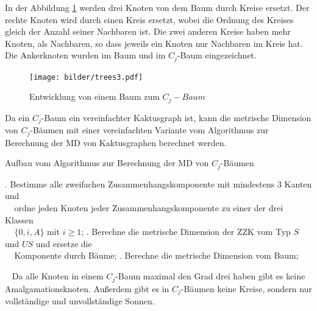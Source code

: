 \begin{bsp}
In der Abbildung \ref{c_jbaum} werden drei Knoten von dem Baum durch Kreise ersetzt. Der rechte Knoten wird durch einen Kreis ersetzt, wobei die Ordnung des Kreises gleich der Anzahl seiner Nachbaren ist. Die zwei anderen Kreise haben mehr Knoten, als Nachbaren, so dass jeweils ein Knoten nur Nachbaren im Kreis hat. Die Ankerknoten wurden im Baum und im $C_j$-Baum eingezeichnet.\\
\vspace{-4mm}
\begin{figure}[h!]
		\centering 		 
   \texttt{[image: bilder/trees3.pdf]}
	\caption{Entwicklung von einem Baum zum $C_{j}-Baum$}
	\label{c_jbaum}
  	 \end{figure}
\vspace{-4mm}
\end{bsp}
\begin{bem}
Da ein $C_j$-Baum ein vereinfachter Kaktusgraph ist, kann die metrische Dimension von $C_j$-Bäumen mit einer vereinfachten Variante vom Algorithmus zur Berechnung der MD von Kaktusgraphen berechnet werden.
\begin{algorithm}
\caption{Aufbau vom Algorithmus zur Berechnung der MD von $C_j$-Bäumen}
\begin{algorithmic}
. Bestimme alle zweifachen Zusammenhangskomponente mit mindestens 3 Kanten und\\$\;\;\;\;$ordne jeden Knoten jeder Zusammenhangskomponente zu einer der drei Klassen\\$\;\;\;\;\{0,i,A\}$ mit $i \geq 1$;
. Berechne die metrische Dimension der ZZK vom Typ $S$ und $US$ und ersetze die\\$\;\;\;\;$Komponente durch Bäume;
. Berechne die metrische Dimension vom Baum;
\end{algorithmic}
\end{algorithm}
~\linebreak
Da alle Knoten in einem $C_j$-Baum maximal den Grad drei haben gibt es keine Amalgamationsknoten. Außerdem gibt es in $C_j$-Bäumen keine Kreise, sondern nur vollständige und unvollständige Sonnen.
\end{bem}
